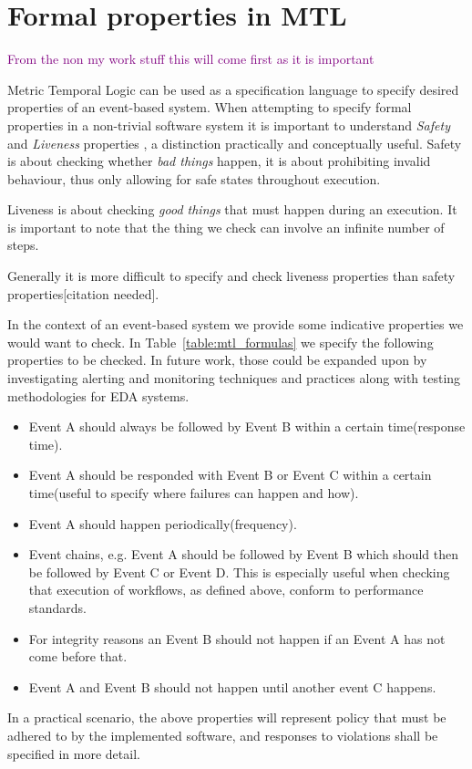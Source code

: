 \documentclass[twocolumn]{article}
\newcommand{\note}[1] {
	\textcolor{Purple}{#1}

}
\begin{document}
\section{Formal properties in MTL}

\note{From the non my work stuff this will come first as it is important}
Metric Temporal Logic can be used as a specification language to specify desired properties of an event-based system.
When attempting to specify formal properties in a non-trivial software system it is important to understand {\it Safety} and {\it Liveness} properties \cite{lamport_what_1983} , a distinction practically and conceptually useful.
Safety is about checking whether {\it bad things} happen, it is about prohibiting invalid behaviour, thus only allowing for safe states throughout execution.

Liveness is about checking {\it good things} that must happen during an execution. It is important to note that the thing we check can involve an infinite number of steps.

Generally it is more difficult to specify and check liveness properties than safety properties[citation needed].


In the context of an event-based system we provide some indicative properties we would want to check. In Table~\ref{table:mtl_formulas} we specify the following properties to be checked. In future work, those could be expanded upon by investigating alerting and monitoring techniques and practices along with testing methodologies for EDA systems.
\begin{itemize}
	\item Event A should always be followed by Event B within a certain time(response time).
	\item Event A should be responded with Event B or Event C within a certain time(useful to specify where failures can happen and how).
	\item Event A should happen periodically(frequency).
	\item Event chains, e.g. Event A should be followed by Event B which should then be followed by Event C or Event D. This is especially useful when checking that execution of workflows, as defined above, conform to performance standards.
	\item For integrity reasons an Event B should not happen if an Event A has not come before that.
	\item Event A and Event B should not happen until another event C happens.
\end{itemize}
In a practical scenario, the above properties will represent policy that must be adhered to by the implemented software, and responses to violations shall be specified in more detail.
\end{document}

